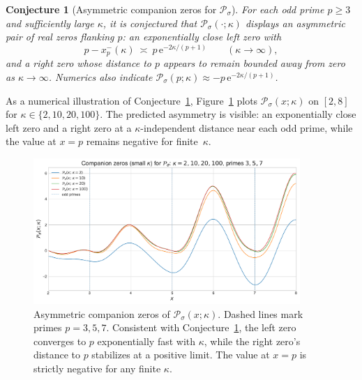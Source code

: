 \documentclass[11pt,a4paper]{amsart}
\theoremstyle{plain}
\newtheorem{conjecture}[theorem]{Conjecture}
\theoremstyle{definition}
\theoremstyle{remark}
\begin{document}
\begin{conjecture}[Asymmetric companion zeros for $\mathcal{P}_{\sigma}$]\label{conj:Psigma-companions}
For each odd prime $p\ge 3$ and sufficiently large $\kappa$, it is conjectured that $\mathcal P_\sigma(\cdot;\kappa)$ displays an asymmetric pair of real zeros flanking $p$: an exponentially close left zero with
\[
p - x_p^-(\kappa)\ \asymp\ p\,\mathrm e^{-2\kappa/(p+1)}\qquad(\kappa\to\infty),
\]
and a right zero whose distance to $p$ appears to remain bounded away from zero as $\kappa\to\infty$. Numerics also indicate $\mathcal P_\sigma(p;\kappa) \approx -p\,\mathrm e^{-2\kappa/(p+1)}$.
\end{conjecture}


As a numerical illustration of Conjecture~\ref{conj:Psigma-companions}, 
Figure~\ref{fig:PsigmaCompanions} plots $\mathcal P_\sigma(x;\kappa)$ on $[2,8]$ for 
$\kappa\in\{2,10,20,100\}$. The predicted asymmetry is visible: an exponentially close left zero and a right zero at a $\kappa$-independent distance near each odd prime, while the value at $x=p$ remains negative for finite~$\kappa$.

\begin{figure}[!htbp]
\centering
\includegraphics[width=0.9\textwidth]{plot_companion_zeros_sigma.pdf}
\caption{Asymmetric companion zeros of $\mathcal{P}_{\sigma}(x;\kappa)$. Dashed lines mark primes $p=3,5,7$. Consistent with Conjecture~\ref{conj:Psigma-companions}, the left zero converges to $p$ exponentially fast with $\kappa$, while the right zero's distance to $p$ stabilizes at a positive limit. The value at $x=p$ is strictly negative for any finite $\kappa$.}
\label{fig:PsigmaCompanions}
\end{figure}

\end{document}
